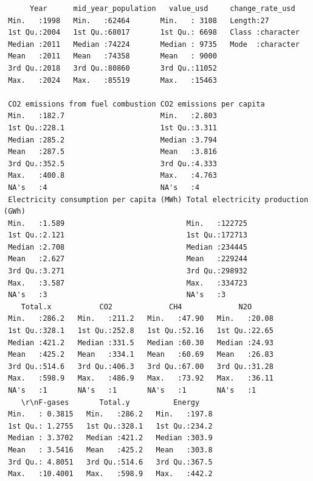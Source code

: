 \documentclass[
  letterpaper,
  DIV=11,
  numbers=noendperiod]{scrartcl}
\begin{document}
\begin{verbatim}
      Year      mid_year_population   value_usd     change_rate_usd   
 Min.   :1998   Min.   :62464       Min.   : 3108   Length:27         
 1st Qu.:2004   1st Qu.:68017       1st Qu.: 6698   Class :character  
 Median :2011   Median :74224       Median : 9735   Mode  :character  
 Mean   :2011   Mean   :74358       Mean   : 9000                     
 3rd Qu.:2018   3rd Qu.:80860       3rd Qu.:11052                     
 Max.   :2024   Max.   :85519       Max.   :15463                     
                                                                      
 CO2 emissions from fuel combustion CO2 emissions per capita
 Min.   :182.7                      Min.   :2.803           
 1st Qu.:228.1                      1st Qu.:3.311           
 Median :285.2                      Median :3.794           
 Mean   :287.5                      Mean   :3.816           
 3rd Qu.:352.5                      3rd Qu.:4.333           
 Max.   :400.8                      Max.   :4.763           
 NA's   :4                          NA's   :4               
 Electricity consumption per capita (MWh) Total electricity production (GWh)
 Min.   :1.589                            Min.   :122725                    
 1st Qu.:2.121                            1st Qu.:172713                    
 Median :2.708                            Median :234445                    
 Mean   :2.627                            Mean   :229244                    
 3rd Qu.:3.271                            3rd Qu.:298932                    
 Max.   :3.587                            Max.   :334723                    
 NA's   :3                                NA's   :3                         
    Total.x           CO2             CH4             N2O       
 Min.   :286.2   Min.   :211.2   Min.   :47.90   Min.   :20.08  
 1st Qu.:328.1   1st Qu.:252.8   1st Qu.:52.16   1st Qu.:22.65  
 Median :421.2   Median :331.5   Median :60.30   Median :24.93  
 Mean   :425.2   Mean   :334.1   Mean   :60.69   Mean   :26.83  
 3rd Qu.:514.6   3rd Qu.:406.3   3rd Qu.:67.00   3rd Qu.:31.28  
 Max.   :598.9   Max.   :486.9   Max.   :73.92   Max.   :36.11  
 NA's   :1       NA's   :1       NA's   :1       NA's   :1      
    \r\nF-gases       Total.y          Energy     
 Min.   : 0.3815   Min.   :286.2   Min.   :197.8  
 1st Qu.: 1.2755   1st Qu.:328.1   1st Qu.:234.2  
 Median : 3.3702   Median :421.2   Median :303.9  
 Mean   : 3.5416   Mean   :425.2   Mean   :303.8  
 3rd Qu.: 4.8051   3rd Qu.:514.6   3rd Qu.:367.5  
 Max.   :10.4001   Max.   :598.9   Max.   :442.2  

\end{verbatim}
\end{document}
